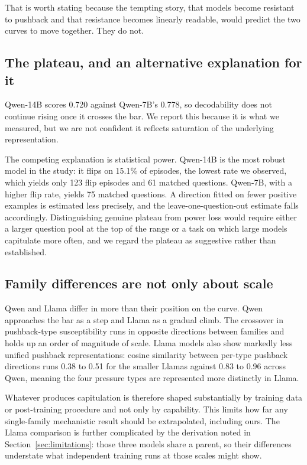 That is worth stating because the tempting story, that models become resistant to pushback
and that resistance becomes linearly readable, would predict the two curves to move
together. They do not.

\subsection{The plateau, and an alternative explanation for it}
\label{sec:plateau}

Qwen-14B scores 0.720 against Qwen-7B's 0.778, so decodability does not continue rising once
it crosses the bar. We report this because it is what we measured, but we are not confident
it reflects saturation of the underlying representation.

The competing explanation is statistical power. Qwen-14B is the most robust model in the
study: it flips on 15.1\% of episodes, the lowest rate we observed, which yields only 123
flip episodes and 61 matched questions. Qwen-7B, with a higher flip rate, yields 75 matched
questions. A direction fitted on fewer positive examples is estimated less precisely, and the
leave-one-question-out estimate falls accordingly. Distinguishing genuine plateau from power
loss would require either a larger question pool at the top of the range or a task on which
large models capitulate more often, and we regard the plateau as suggestive rather than
established.

\subsection{Family differences are not only about scale}

Qwen and Llama differ in more than their position on the curve. Qwen approaches the bar as a
step and Llama as a gradual climb. The crossover in pushback-type susceptibility runs in
opposite directions between families and holds up an order of magnitude of scale. Llama
models also show markedly less unified pushback representations: cosine similarity between
per-type pushback directions runs 0.38 to 0.51 for the smaller Llamas against 0.83 to 0.96
across Qwen, meaning the four pressure types are represented more distinctly in Llama.

Whatever produces capitulation is therefore shaped substantially by training data or
post-training procedure and not only by capability. This limits how far any single-family
mechanistic result should be extrapolated, including ours. The Llama comparison is further complicated by the derivation noted in Section~\ref{sec:limitations}: those three models share a parent, so their differences understate what independent training runs at those scales might show.

